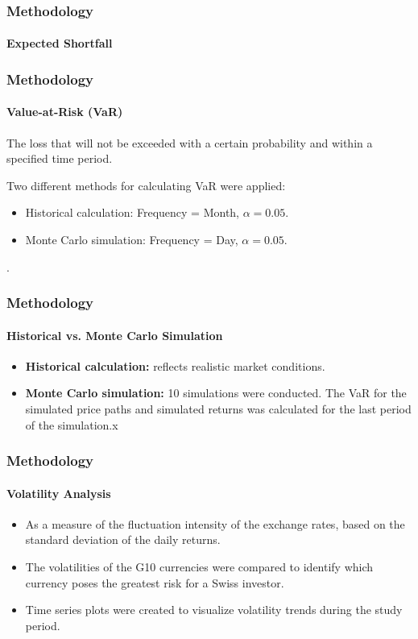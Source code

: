 \documentclass[10pt]{beamer}
\begin{document}
\begin{frame}
\frametitle{Methodology}
\framesubtitle{Expected Shortfall}

\end{frame}
\begin{frame}
\frametitle{Methodology}
\framesubtitle{Value-at-Risk (VaR)}
The loss that will not be exceeded with a certain probability and within a specified time period. 

Two different methods for calculating VaR were applied:
\begin{itemize}
    \item Historical calculation: Frequency = Month, $\alpha = 0.05$. 
    \item Monte Carlo simulation: Frequency = Day, $\alpha = 0.05$.
\end{itemize}.

\end{frame}
\begin{frame}
\frametitle{Methodology}
\framesubtitle{Historical vs. Monte Carlo Simulation}
\begin{itemize}
    \item \textbf{Historical calculation:} reflects realistic market conditions.
    \item \textbf{Monte Carlo simulation:} 10 simulations were conducted. The VaR for the simulated price paths and simulated returns was calculated for the last period of the simulation.x
\end{itemize}
\end{frame}
\begin{frame}
\frametitle{Methodology}
\framesubtitle{Volatility Analysis}
\begin{itemize}
    \item As a measure of the fluctuation intensity of the exchange rates, based on the standard deviation of the daily returns.
    \item The volatilities of the G10 currencies were compared to identify which currency poses the greatest risk for a Swiss investor.
    \item Time series plots were created to visualize volatility trends during the study period.
\end{itemize}
\end{frame}
\end{document}
